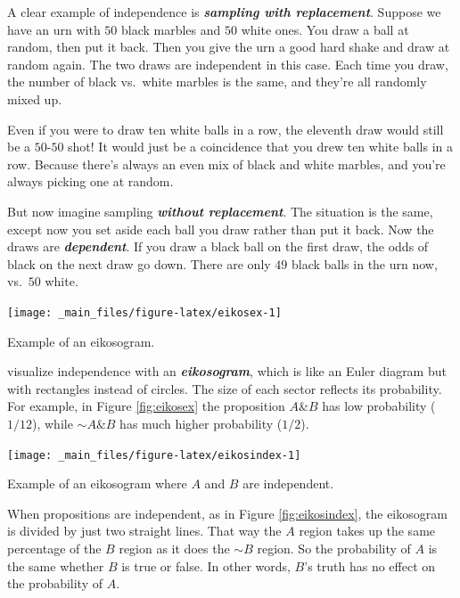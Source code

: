 \documentclass[justified]{tufte-book}
\renewcommand{\neg}{\mathbin{\sim}}
\renewcommand{\wedge}{\mathbin{\&}}
\theoremstyle{definition}
\theoremstyle{definition}
\theoremstyle{definition}
\theoremstyle{definition}
\theoremstyle{remark}
\begin{document}
A clear example of independence is \textbf{\emph{sampling with replacement}}. Suppose we have an urn with \(50\) black marbles and \(50\) white ones. You draw a ball at random, then put it back. Then you give the urn a good hard shake and draw at random again. The two draws are independent in this case. Each time you draw, the number of black vs.~white marbles is the same, and they're all randomly mixed up.

Even if you were to draw ten white balls in a row, the eleventh draw would still be a \(50\)-\(50\) shot! It would just be a coincidence that you drew ten white balls in a row. Because there's always an even mix of black and white marbles, and you're always picking one at random.

But now imagine sampling \textbf{\emph{without replacement}}. The situation is the same, except now you set aside each ball you draw rather than put it back. Now the draws are \textbf{\emph{dependent}}. If you draw a black ball on the first draw, the odds of black on the next draw go down. There are only \(49\) black balls in the urn now, vs.~\(50\) white.

\begin{marginfigure}
\texttt{[image: \_main\_files/figure-latex/eikosex-1]} \caption[Example of an eikosogram]{Example of an eikosogram.}\label{fig:eikosex}
\end{marginfigure}

 visualize independence with an \textbf{\emph{eikosogram}}, which is like an Euler diagram but with rectangles instead of circles. The size of each sector reflects its probability. For example, in Figure \ref{fig:eikosex} the proposition \(A \wedge B\) has low probability (\(1/12\)), while \(\neg A \wedge B\) has much higher probability (\(1/2\)).

\begin{marginfigure}
\texttt{[image: \_main\_files/figure-latex/eikosindex-1]} \caption[Example of an eikosogram where $A$ and $B$ are independent]{Example of an eikosogram where $A$ and $B$ are independent.}\label{fig:eikosindex}
\end{marginfigure}

When propositions are independent, as in Figure \ref{fig:eikosindex}, the eikosogram is divided by just two straight lines. That way the \(A\) region takes up the same percentage of the \(B\) region as it does the \(\neg B\) region. So the probability of \(A\) is the same whether \(B\) is true or false. In other words, \(B\)'s truth has no effect on the probability of \(A\).
\end{document}
